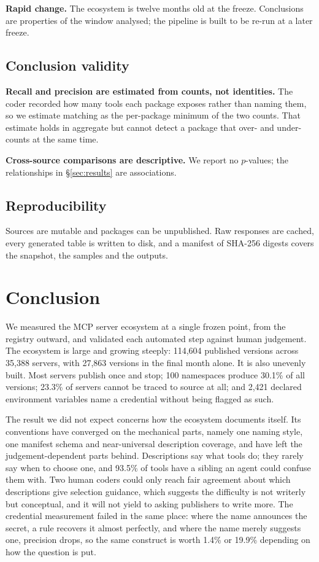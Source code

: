 \documentclass[a4paper,fleqn]{cas-dc}
\begin{document}
\textbf{Rapid change.} The ecosystem is twelve months old at the freeze.
Conclusions are properties of the window analysed; the pipeline is built to be
re-run at a later freeze.

\subsection{Conclusion validity}

\textbf{Recall and precision are estimated from counts, not identities.} The
coder recorded how many tools each package exposes rather than naming them, so
we estimate matching as the per-package minimum of the two counts. That
estimate holds in aggregate but cannot detect a package that over- and
under-counts at the same time.

\textbf{Cross-source comparisons are descriptive.} We report no $p$-values; the
relationships in \S\ref{sec:results} are associations.

\subsection{Reproducibility}

Sources are mutable and packages can be unpublished. Raw responses are cached,
every generated table is written to disk, and a manifest of SHA-256 digests
covers the snapshot, the samples and the outputs.

\section{Conclusion}\label{sec:conclusion}

We measured the MCP server ecosystem at a single frozen point, from the registry
outward, and validated each automated step against human judgement. The
ecosystem is large and growing steeply: 114,604 published versions across
35,388 servers, with 27,863 versions in the final month alone. It is also
unevenly built. Most servers publish once and stop; 100 namespaces produce
30.1\% of all versions; 23.3\% of servers cannot be traced to source at all;
and 2,421 declared environment variables name a credential without being
flagged as such.

The result we did not expect concerns how the ecosystem documents itself. Its
conventions have converged on the mechanical parts, namely one naming style,
one manifest schema and near-universal description coverage, and have left the
judgement-dependent parts behind. Descriptions say what tools do; they rarely
say when to choose one, and 93.5\% of tools have a sibling an agent could
confuse them with. Two human coders could only reach fair agreement about which
descriptions give selection guidance, which suggests the difficulty is not
writerly but conceptual, and it will not yield to asking publishers to write
more. The credential measurement failed in the same place: where the name
announces the secret, a rule recovers it almost perfectly, and where the name
merely suggests one, precision drops, so the same construct is worth 1.4\% or
19.9\% depending on how the question is put.
\end{document}
